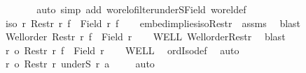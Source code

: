 \begin{isabellebody}
\ \ \isamarkupfalse%
\ {}\ {}\ \isamarkupfalse%
\ {\isacharparenleft}{\kern0pt}auto\ simp\ add{\isacharcolon}{\kern0pt}\ wo{\isacharunderscore}{\kern0pt}rel{\isachardot}{\kern0pt}ofilter{\isacharunderscore}{\kern0pt}underS{\isacharunderscore}{\kern0pt}Field\ wo{\isacharunderscore}{\kern0pt}rel{\isacharunderscore}{\kern0pt}def{\isacharparenright}{\kern0pt}\isanewline
\ \ \isamarkupfalse%
\ {\isachardoublequoteopen}iso\ r{\isacharprime}{\kern0pt}\ {\isacharparenleft}{\kern0pt}Restr\ r\ {\isacharparenleft}{\kern0pt}f\ {\isacharbackquote}{\kern0pt}\ {\isacharparenleft}{\kern0pt}Field\ r{\isacharprime}{\kern0pt}{\isacharparenright}{\kern0pt}{\isacharparenright}{\kern0pt}{\isacharparenright}{\kern0pt}\ f{\isachardoublequoteclose}\isanewline
\ \ \isamarkupfalse%
\ embed{\isacharunderscore}{\kern0pt}implies{\isacharunderscore}{\kern0pt}iso{\isacharunderscore}{\kern0pt}Restr\ {}\ assms\ \isamarkupfalse%
\ blast\isanewline
\ \ \isamarkupfalse%
\ \isamarkupfalse%
\ {\isachardoublequoteopen}Well{\isacharunderscore}{\kern0pt}order\ {\isacharparenleft}{\kern0pt}Restr\ r\ {\isacharparenleft}{\kern0pt}f\ {\isacharbackquote}{\kern0pt}\ {\isacharparenleft}{\kern0pt}Field\ r{\isacharprime}{\kern0pt}{\isacharparenright}{\kern0pt}{\isacharparenright}{\kern0pt}{\isacharparenright}{\kern0pt}{\isachardoublequoteclose}\isanewline
\ \ \isamarkupfalse%
\ WELL\ Well{\isacharunderscore}{\kern0pt}order{\isacharunderscore}{\kern0pt}Restr\ \isamarkupfalse%
\ blast\isanewline
\ \ \isamarkupfalse%
\ \isamarkupfalse%
\ {\isachardoublequoteopen}r{\isacharprime}{\kern0pt}\ {\isacharequal}{\kern0pt}o\ Restr\ r\ {\isacharparenleft}{\kern0pt}f\ {\isacharbackquote}{\kern0pt}\ {\isacharparenleft}{\kern0pt}Field\ r{\isacharprime}{\kern0pt}{\isacharparenright}{\kern0pt}{\isacharparenright}{\kern0pt}{\isachardoublequoteclose}\isanewline
\ \ \isamarkupfalse%
\ WELL{\isacharprime}{\kern0pt}\ \isamarkupfalse%
\ ordIso{\isacharunderscore}{\kern0pt}def\ \isamarkupfalse%
\ auto\isanewline
\ \ \isamarkupfalse%
\ {\isachardoublequoteopen}r{\isacharprime}{\kern0pt}\ {\isacharequal}{\kern0pt}o\ Restr\ r\ {\isacharparenleft}{\kern0pt}underS\ r\ a{\isacharparenright}{\kern0pt}{\isachardoublequoteclose}\ \isamarkupfalse%
\ {}\ \isamarkupfalse%
\ auto\isanewline
\ \ \isamarkupfalse%

\end{isabellebody}
